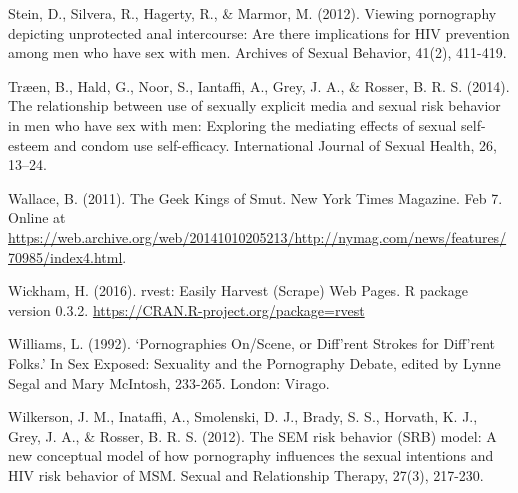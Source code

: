 \documentclass[]{article}
\begin{document}
Stein, D., Silvera, R., Hagerty, R., \& Marmor, M. (2012). Viewing
pornography depicting unprotected anal intercourse: Are there
implications for HIV prevention among men who have sex with men.
Archives of Sexual Behavior, 41(2), 411-419.

Træen, B., Hald, G., Noor, S., Iantaffi, A., Grey, J. A., \& Rosser, B.
R. S. (2014). The relationship between use of sexually explicit media
and sexual risk behavior in men who have sex with men: Exploring the
mediating effects of sexual self-esteem and condom use self-efficacy.
International Journal of Sexual Health, 26, 13--24.

Wallace, B. (2011). The Geek Kings of Smut. New York Times Magazine. Feb
7. Online at
\url{https://web.archive.org/web/20141010205213/http://nymag.com/news/features/70985/index4.html}.

Wickham, H. (2016). rvest: Easily Harvest (Scrape) Web Pages. R package
version 0.3.2. \url{https://CRAN.R-project.org/package=rvest}

Williams, L. (1992). `Pornographies On/Scene, or Diff'rent Strokes for
Diff'rent Folks.' In Sex Exposed: Sexuality and the Pornography Debate,
edited by Lynne Segal and Mary McIntosh, 233-265. London: Virago.

Wilkerson, J. M., Inataffi, A., Smolenski, D. J., Brady, S. S., Horvath,
K. J., Grey, J. A., \& Rosser, B. R. S. (2012). The SEM risk behavior
(SRB) model: A new conceptual model of how pornography influences the
sexual intentions and HIV risk behavior of MSM. Sexual and Relationship
Therapy, 27(3), 217-230.
\end{document}
